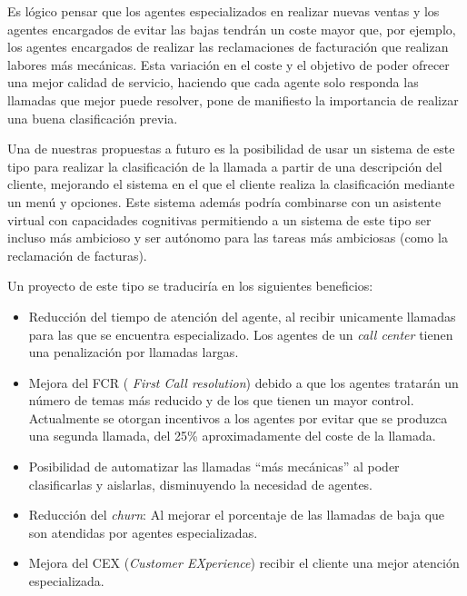Es lógico pensar que los agentes especializados en realizar nuevas ventas y los agentes encargados de evitar las bajas tendrán un coste mayor que, por ejemplo, los agentes encargados de realizar las reclamaciones de facturación que realizan labores más mecánicas. Esta variación en el coste y el objetivo de poder ofrecer una mejor calidad de servicio, haciendo que cada agente solo responda las llamadas que mejor puede resolver, pone de manifiesto la importancia de realizar una buena clasificación previa. 

Una de nuestras propuestas a futuro es la posibilidad de usar un sistema de este tipo para realizar la clasificación de la llamada a partir de una descripción del cliente, mejorando el sistema en el que el cliente realiza la clasificación mediante un menú y opciones. Este sistema además podría combinarse con un asistente virtual con capacidades cognitivas permitiendo a un sistema de este tipo ser incluso más ambicioso y ser autónomo para las tareas más ambiciosas (como la reclamación de facturas).

Un proyecto de este tipo se traduciría en los siguientes beneficios: 

\begin{itemize}
\item Reducción del tiempo de atención del agente, al recibir unicamente llamadas para las que se encuentra especializado. Los agentes de un \textit{call center} tienen una penalización por llamadas largas. 
\item Mejora del FCR ( \textit{First Call resolution}) debido a que los agentes tratarán un número de temas más reducido y de los que tienen un mayor control. Actualmente se otorgan incentivos a los agentes por evitar que se produzca una segunda llamada, del 25\% aproximadamente del coste de la llamada. 
\item Posibilidad de automatizar las llamadas ``más mecánicas'' al poder clasificarlas y aislarlas, disminuyendo la necesidad de agentes. 

\item Reducción del \textit{churn}: Al mejorar el porcentaje de las llamadas de baja que son atendidas por agentes especializadas.

\item Mejora del CEX (\textit{Customer EXperience}) recibir el cliente una mejor atención especializada.



\end{itemize}

